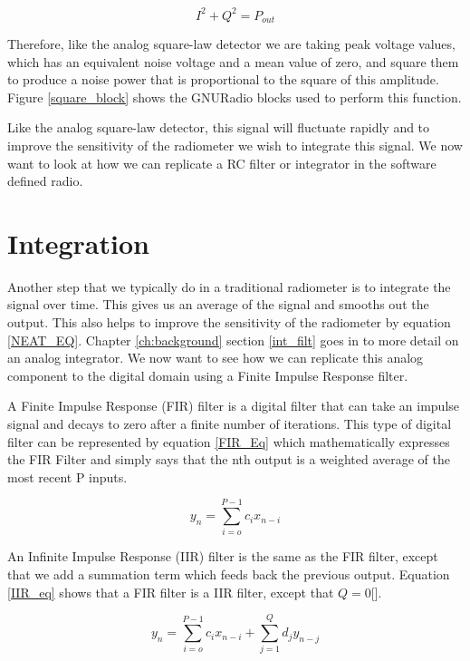 \begin{equation}\label{sdr_x2}
I^2+Q^2 = P_{out}
\end{equation}

Therefore, like the analog square-law detector we are taking peak voltage values, which has an equivalent noise voltage and a mean value of zero, and square them to produce a noise power that is proportional to the square of this amplitude.  Figure \ref{square_block} shows the GNURadio blocks used to perform this function.

Like the analog square-law detector, this signal will fluctuate rapidly and to improve the sensitivity of the radiometer we wish to integrate this signal.  We now want to look at how we can replicate a RC filter or integrator in the software defined radio.

\section{Integration}

Another step that we typically do in a traditional radiometer is to integrate the signal over time.  This gives us an average of the signal and smooths out the output.  This also helps to improve the sensitivity of the radiometer by equation \ref{NEAT_EQ}.  Chapter \ref{ch:background} section \ref{int_filt} goes in to more detail on an analog integrator.  We now want to see how we can replicate this analog component to the digital domain using a Finite Impulse Response filter.

A Finite Impulse Response (FIR) filter is a digital filter that can take an impulse signal and decays to zero after a finite number of iterations.  This type of digital filter can be represented by equation \ref{FIR_Eq} which mathematically expresses the FIR Filter and simply says that the nth output is a weighted average of the most recent P inputs. 

\begin{equation}\label{FIR_Eq}
y_n=\displaystyle\sum\limits_{i=o}^{P-1} c_ix_{n-i}
\end{equation} 

An Infinite Impulse Response (IIR) filter is the same as the FIR filter, except that we add a summation term which feeds back the previous output.  Equation \ref{IIR_eq} shows that a FIR filter is a IIR filter, except that $Q=0$[\cite{Cross}]. 

\begin{equation}\label{IIR_eq}
y_n=\displaystyle\sum\limits_{i=o}^{P-1} c_ix_{n-i}+\displaystyle\sum\limits_{j=1}^{Q} d_jy_{n-j}
\end{equation}

